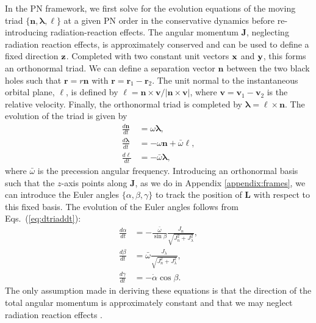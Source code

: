 \documentclass[%
aps,
prd,
amssymb,
amsmath,
amsfonts,
eqsecnum,
showpacs,
nofootinbib,
floatfix,
twocolumn,
twoside,
a4paper,
superscriptaddress
]{revtex4-1}
\newcommand{\bfJ}{\boldsymbol{J} \xspace}
\newcommand{\bfL}{\boldsymbol{L} \xspace}
\newcommand{\bfell}{\boldsymbol{\ell} \xspace}
\newcommand{\bflambda}{\boldsymbol{\lambda} \xspace}
\newcommand{\bfn}{\boldsymbol{n} \xspace}
\newcommand{\bfv}{\boldsymbol{v}}
\newcommand{\bfr}{\mathbf{{r}}}
\begin{document}
In the PN framework, we first solve for the evolution equations of the moving triad $\lbrace \bfn, \bflambda, \bfell \rbrace$ at a given PN order in the conservative dynamics before re-introducing radiation-reaction effects. The angular momentum $\bfJ$, neglecting radiation reaction effects, is approximately conserved and can be used to define a fixed direction $\bf{z}$. Completed with two constant unit vectors $\bf{x}$ and $\bf{y}$, this forms an orthonormal triad. We can define a separation vector $\bfn$ between the two black holes such that $\bfr = r \bfn$ with $\bfr = \bfr_1 - \bfr_2$.
The unit normal to the instantaneous orbital plane, $\bfell$, is defined by $\bfell = \bfn \times \bfv / | \bfn \times \bfv |$, where $\bfv = \bfv_1 - \bfv_2$ is the relative velocity. Finally, the orthonormal triad is completed by $\bflambda = \bfell \times \bfn$. The evolution of the triad is given by \cite{Blanchet:2011zv,Marsat:2013wwa}
\begin{subequations}
\label{eq:dtriaddt}
\begin{align}
    \label{eq:dfndt}
    \frac{d \bfn}{dt} &= \omega \bflambda , \\
    \label{eq:dflambdadt}
    \frac{d \bflambda}{d t} &= - \omega \bfn + \bar{\omega} \bfell , \\
    \label{eq:dfelldt}
    \frac{d \bfell}{d t} &= - \bar{\omega} \bflambda ,
\end{align}
\end{subequations}
\newline 
where $\bar{\omega}$ is the precession angular frequency. Introducing an orthonormal basis such that the $z$-axis points along $\bfJ$, as we do in Appendix \ref{appendix:frames}, we can introduce the Euler angles $\lbrace \alpha, \beta, \gamma \rbrace$ to track the position of $\bfL$ with respect to this fixed basis. The evolution of the Euler angles follows from Eqs.~(\ref{eq:dtriaddt}):
\begin{subequations}
\begin{align}
    \frac{d \alpha}{d t} &= -\frac{\bar{\omega}}{\sin \beta} \frac{J_n}{\sqrt{J^2_n + J^2_{\lambda}}} , \\
    \frac{d \beta}{d t} &= \bar{\omega} \frac{J_{\lambda}}{\sqrt{J^2_n + J^2_{\lambda}}}, \\
    \frac{d \gamma}{d t} &= - \dot{\alpha} \cos \beta .
\end{align}
\end{subequations}
The only assumption made in deriving these equations is that the direction of the total angular momentum is approximately constant and that we may neglect radiation reaction effects \cite{Blanchet:2011zv}. 
\end{document}
